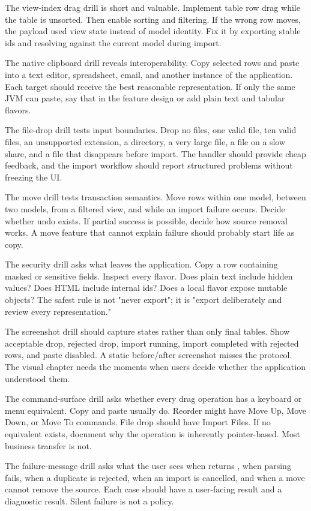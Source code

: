 The view-index drag drill is short and valuable. Implement table row drag while the table is unsorted. Then enable sorting and filtering. If the wrong row moves, the payload used view state instead of model identity. Fix it by exporting stable ids and resolving against the current model during import.

The native clipboard drill reveals interoperability. Copy selected rows and paste into a text editor, spreadsheet, email, and another instance of the application. Each target should receive the best reasonable representation. If only the same JVM can paste, say that in the feature design or add plain text and tabular flavors.

The file-drop drill tests input boundaries. Drop no files, one valid file, ten valid files, an unsupported extension, a directory, a very large file, a file on a slow share, and a file that disappears before import. The handler should provide cheap feedback, and the import workflow should report structured problems without freezing the UI.

The move drill tests transaction semantics. Move rows within one model, between two models, from a filtered view, and while an import failure occurs. Decide whether undo exists. If partial success is possible, decide how source removal works. A move feature that cannot explain failure should probably start life as copy.

The security drill asks what leaves the application. Copy a row containing masked or sensitive fields. Inspect every flavor. Does plain text include hidden values? Does HTML include internal ids? Does a local flavor expose mutable objects? The safest rule is not "never export"; it is "export deliberately and review every representation."

The screenshot drill should capture states rather than only final tables. Show acceptable drop, rejected drop, import running, import completed with rejected rows, and paste disabled. A static before/after screenshot misses the protocol. The visual chapter needs the moments when users decide whether the application understood them.

The command-surface drill asks whether every drag operation has a keyboard or menu equivalent. Copy and paste usually do. Reorder might have Move Up, Move Down, or Move To commands. File drop should have Import Files. If no equivalent exists, document why the operation is inherently pointer-based. Most business transfer is not.

The failure-message drill asks what the user sees when  returns , when parsing fails, when a duplicate is rejected, when an import is cancelled, and when a move cannot remove the source. Each case should have a user-facing result and a diagnostic result. Silent failure is not a policy.

